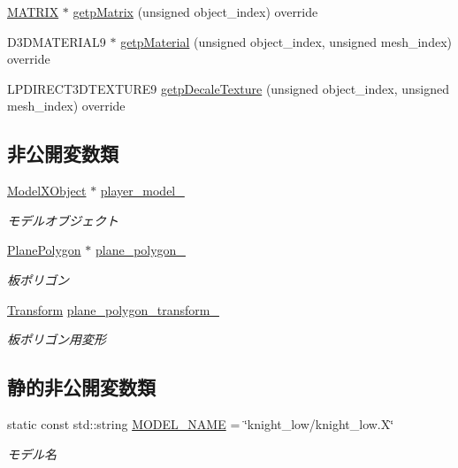 \begin{DoxyCompactItemize}
\item 
\mbox{\hyperlink{_vector3_d_8h_a032295cd9fb1b711757c90667278e744}{M\+A\+T\+R\+IX}} $\ast$ \mbox{\hyperlink{class_stencil_shadow_test_draw_a8ab105b75d673adc52698a8401c6525c}{getp\+Matrix}} (unsigned object\+\_\+index) override
\item 
D3\+D\+M\+A\+T\+E\+R\+I\+A\+L9 $\ast$ \mbox{\hyperlink{class_stencil_shadow_test_draw_aacdc680646f832451ea575f1da1eec9a}{getp\+Material}} (unsigned object\+\_\+index, unsigned mesh\+\_\+index) override
\item 
L\+P\+D\+I\+R\+E\+C\+T3\+D\+T\+E\+X\+T\+U\+R\+E9 \mbox{\hyperlink{class_stencil_shadow_test_draw_a58f3699fa7ced20625edca807698aa85}{getp\+Decale\+Texture}} (unsigned object\+\_\+index, unsigned mesh\+\_\+index) override
\end{DoxyCompactItemize}
\subsection*{非公開変数類}
\begin{DoxyCompactItemize}
\item 
\mbox{\hyperlink{class_model_x_object}{Model\+X\+Object}} $\ast$ \mbox{\hyperlink{class_stencil_shadow_test_draw_a6c57baf28efdf89dbfb52fb379f33c26}{player\+\_\+model\+\_\+}}
\begin{DoxyCompactList}\small\item\em モデルオブジェクト \end{DoxyCompactList}\item 
\mbox{\hyperlink{class_plane_polygon}{Plane\+Polygon}} $\ast$ \mbox{\hyperlink{class_stencil_shadow_test_draw_ae2abfaec1e669ea0019e67d02e2942b6}{plane\+\_\+polygon\+\_\+}}
\begin{DoxyCompactList}\small\item\em 板ポリゴン \end{DoxyCompactList}\item 
\mbox{\hyperlink{class_transform}{Transform}} \mbox{\hyperlink{class_stencil_shadow_test_draw_ae64a0179736364fd9e6d26074edcf61a}{plane\+\_\+polygon\+\_\+transform\+\_\+}}
\begin{DoxyCompactList}\small\item\em 板ポリゴン用変形 \end{DoxyCompactList}\end{DoxyCompactItemize}
\subsection*{静的非公開変数類}
\begin{DoxyCompactItemize}
\item 
static const std\+::string \mbox{\hyperlink{class_stencil_shadow_test_draw_a1ef49214f41a9fa1f3c2a7616eaf5655}{M\+O\+D\+E\+L\+\_\+\+N\+A\+ME}} = \char`\"{}knight\+\_\+low/knight\+\_\+low.\+X\char`\"{}
\begin{DoxyCompactList}\small\item\em モデル名 \end{DoxyCompactList}\end{DoxyCompactItemize}


